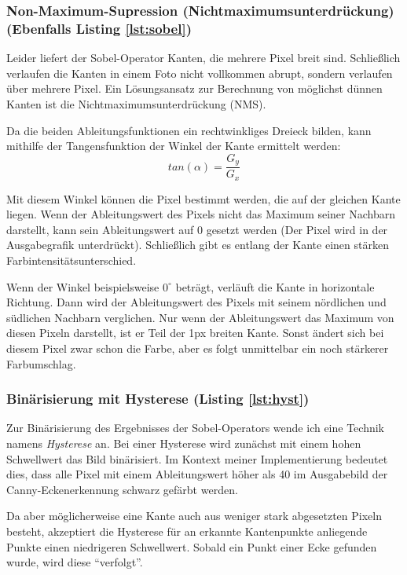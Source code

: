 \subsubsection{Non-Maximum-Supression (Nichtmaximumsunterdrückung) (Ebenfalls Listing \ref{lst:sobel})}
Leider liefert der Sobel-Operator Kanten, die mehrere Pixel breit sind. Schließlich verlaufen die Kanten in einem Foto nicht vollkommen abrupt, sondern verlaufen über mehrere Pixel. 
Ein Lösungsansatz zur Berechnung von möglichst dünnen Kanten ist die Nichtmaximumsunterdrückung (NMS). 

Da die beiden Ableitungsfunktionen ein rechtwinkliges Dreieck bilden, kann mithilfe der Tangensfunktion der Winkel der Kante ermittelt werden:
\begin{equation}
	tan(\alpha) = \frac{G_y}{G_x}
\end{equation}

Mit diesem Winkel können die Pixel bestimmt werden, die auf der gleichen Kante liegen. Wenn der Ableitungswert des Pixels nicht das Maximum seiner Nachbarn darstellt, kann sein Ableitungswert auf 0 gesetzt werden (Der Pixel wird in der Ausgabegrafik unterdrückt). Schließlich gibt es entlang der Kante einen stärken Farbintensitätsunterschied.  

Wenn der Winkel beispielsweise \(0^{\circ}\) beträgt, verläuft die Kante in horizontale Richtung. Dann wird der Ableitungswert des Pixels mit seinem nördlichen und südlichen Nachbarn verglichen.
Nur wenn der Ableitungswert das Maximum von diesen Pixeln darstellt, ist er Teil der 1px breiten Kante. Sonst ändert sich bei diesem Pixel zwar schon die Farbe, aber es folgt unmittelbar ein noch stärkerer Farbumschlag.

\subsubsection{Binärisierung mit Hysterese (Listing \ref{lst:hyst})}
Zur Binärisierung des Ergebnisses der Sobel-Operators wende ich eine Technik namens \textit{Hysterese} an. Bei einer Hysterese wird zunächst mit einem hohen Schwellwert das Bild binärisiert. 
Im Kontext meiner Implementierung bedeutet dies, dass alle Pixel mit einem Ableitungswert höher als 40 im Ausgabebild der Canny-Eckenerkennung schwarz gefärbt werden.

Da aber möglicherweise eine Kante auch aus weniger stark abgesetzten Pixeln besteht, akzeptiert die Hysterese für an erkannte Kantenpunkte anliegende Punkte einen niedrigeren Schwellwert. Sobald ein Punkt einer Ecke gefunden wurde, wird diese "`verfolgt"'.

